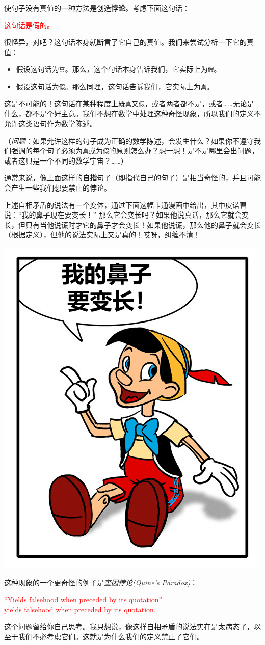 使句子没有真值的一种方法是创造\textbf{悖论}。考虑下面这句话：
\begin{center}
    \textcolor{red}{这句话是假的。}
\end{center}
很怪异，对吧？这句话本身就断言了它自己的真值。我们来尝试分析一下它的真值：
\begin{itemize}
    \item 假设这句话为\verb|真|。那么，这个句话本身告诉我们，它实际上为\verb|假|。
    \item 假设这句话为\verb|假|。那么同理，这句话告诉我们，它实际上为\verb|真|。
\end{itemize}
这是不可能的！这句话在某种程度上既\verb|真|又\verb|假|，或者两者都不是，或者……无论是什么，都不是个好主意。我们不想在数学中处理这种奇怪现象，所以我们的定义不允许这类语句作为数学陈述。

（\emph{问题}：如果允许这样的句子成为正确的数学陈述，会发生什么？如果你不遵守我们强调的每个句子必须为\verb|真|或为\verb|假|的原则怎么办？想一想！是不是哪里会出问题，或者这只是一个不同的数学宇宙？……）

通常来说，像上面这样的\textbf{自指}句子（即指代自己的句子）是相当奇怪的，并且可能会产生一些我们想要禁止的悖论。

上述自相矛盾的说法有一个变体，通过下面这幅卡通漫画中给出，其中皮诺曹说：``我的鼻子现在要变长！'' 那么它会变长吗？如果他说真话，那么它就会变长，但只有当他说谎时才它的鼻子才会变长！如果他说谎，那么他的鼻子就会变长（根据定义），但他的说法实际上又是真的！哎呀，纠缠不清！
\begin{center}
    \includegraphics[scale=0.4]{figure/pinocchio.png}
\end{center}

这种现象的一个更奇怪的例子是\emph{奎因悖论(Quine's Paradox)}：
\begin{center}
    \textcolor{red}{``Yields falsehood when preceded by its quotation'' \\yields falsehood when preceded by its quotation.}
\end{center}
这个问题留给你自己思考。我只想说，像这样自相矛盾的说法实在是太病态了，以至于我们不必考虑它们。这就是为什么我们的定义禁止了它们。
